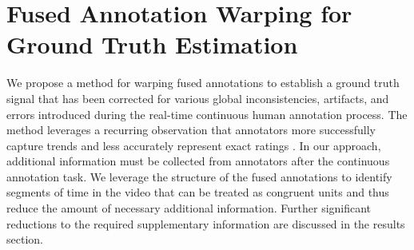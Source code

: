 \documentclass[times,twocolumn,final,authoryear]{elsarticle}
\begin{document}
\section{Fused Annotation Warping for Ground Truth Estimation}

We propose a method for warping fused annotations to establish a ground truth signal that has been corrected for various global inconsistencies, artifacts, and errors introduced during the real-time continuous human annotation process.  The method leverages a recurring observation that annotators more successfully capture trends and less accurately represent exact ratings \citep{Yannakakis2011, metallinou2013annotation, yannakakis2015ratings}.  In our approach, additional information must be collected from annotators after the continuous annotation task.  We leverage the structure of the fused annotations to identify segments of time in the video that can be treated as congruent units and thus reduce the amount of necessary additional information.  Further significant reductions to the required supplementary information are discussed in the results section.
\end{document}

